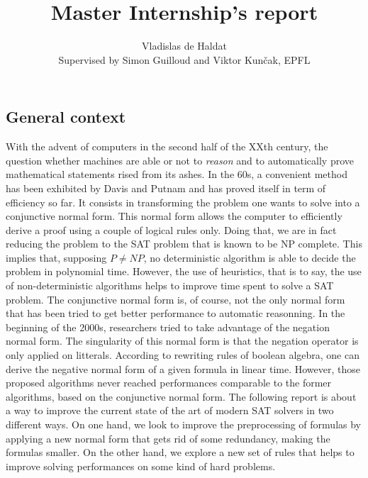 \documentclass[a4paper, 11pt]{article}
\title{Master Internship's report}
\author{Vladislas de Haldat\\\small{Supervised by Simon Guilloud and Viktor Kunčak, EPFL}}
\begin{document}
    \maketitle

	\subsection*{General context}
	With the advent of computers in the second half of the XXth century, the question whether 
	machines are able or not to \textit{reason} and to automatically prove mathematical statements 
	rised from its ashes. In the 60s, a convenient method has been exhibited by Davis and Putnam
	and has proved itself in term of efficiency so far. It consists in transforming the problem one
	wants to solve into a conjunctive normal form. This normal form allows the computer to
	efficiently derive a proof using a couple of logical rules only. Doing that, we are in fact
	reducing the problem to the SAT problem that is known to be NP complete. This implies that,
	supposing $P\neq NP$, no deterministic algorithm is able to decide the problem in polynomial
	time. However, the use of heuristics, that is to say, the use of non-deterministic algorithms
	helps to improve time spent to solve a SAT problem. The conjunctive normal form is, of course,
	not the only normal form that has been tried to get better performance to automatic reasonning.
	In the beginning of the 2000s, researchers tried to take advantage of the negation normal form.
	The singularity of this normal form is that the negation operator is only applied on litterals.
	According to rewriting rules of boolean algebra, one can derive the negative normal form of a
	given formula in linear time. However, those proposed algorithms never reached performances
	comparable to the former algorithms, based on the conjunctive normal form. The following report
	is about a way to improve the current state of the art of modern SAT solvers in two different
	ways. On one hand, we look to improve the preprocessing of formulas by applying a new normal
	form that gets rid of some redundancy, making the formulas smaller. On the other hand, we explore
	a new set of rules that helps to improve solving performances on some kind of hard problems.

\end{document}
